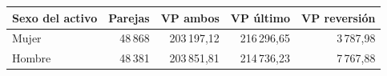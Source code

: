 \begin{tabular}{@{}lrrrr@{}}
\toprule
Sexo del activo & Parejas & VP ambos & VP último & VP reversión \\
\midrule
Mujer & 48\,868 & 203\,197,12 & 216\,296,65 & 3\,787,98 \\
Hombre & 48\,381 & 203\,851,81 & 214\,736,23 & 7\,767,88 \\
\bottomrule
\end{tabular}
